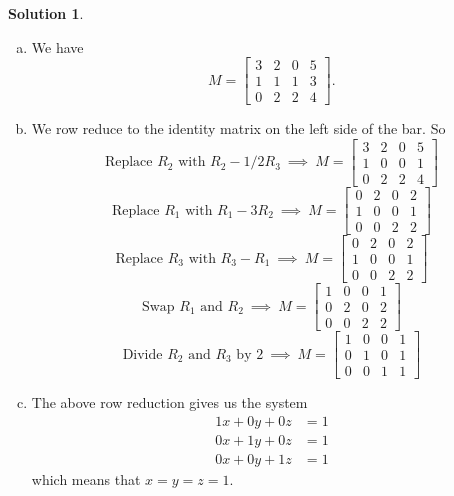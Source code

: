\documentclass[12pt]{report} %
\theoremstyle{definition}
\newtheorem{solution}{Solution}
\begin{document}
\begin{solution}
\begin{enumerate}[(a)]
    \item We have
    \[
    M=\left[ \begin{array}{ccc|c}
        3 & 2 & 0 & 5\\
        1 & 1 & 1 & 3\\
        0 & 2 & 2 & 4
    \end{array}\right].
    \]
    \item We row reduce to the identity matrix on the left side of the bar.  So
    \[
    \textrm{Replace $R_2$ with $R_2-1/2 R_3$} ~\implies~     M=\left[ \begin{array}{ccc|c}
        3 & 2 & 0 & 5\\
        1 & 0 & 0 & 1\\
        0 & 2 & 2 & 4
    \end{array}\right]
    \]
    \[
    \textrm{Replace $R_1$ with $R_1-3 R_2$} ~\implies~     M=\left[ \begin{array}{ccc|c}
        0 & 2 & 0 & 2\\
        1 & 0 & 0 & 1\\
        0 & 0 & 2 & 2
    \end{array}\right]
    \]
    \[
    \textrm{Replace $R_3$ with $R_3- R_1$} ~\implies~     M=\left[ \begin{array}{ccc|c}
        0 & 2 & 0 & 2\\
        1 & 0 & 0 & 1\\
        0 & 0 & 2 & 2
    \end{array}\right]
    \]
    \[
    \textrm{Swap $R_1$ and $R_2$} ~\implies~     M=\left[ \begin{array}{ccc|c}
        1 & 0 & 0 & 1\\
        0 & 2 & 0 & 2\\
        0 & 0 & 2 & 2
    \end{array}\right]
    \]
    \[
    \textrm{Divide $R_2$ and $R_3$ by 2} ~\implies~     M=\left[ \begin{array}{ccc|c}
        1 & 0 & 0 & 1\\
        0 & 1 & 0 & 1\\
        0 & 0 & 1 & 1
    \end{array}\right]
    \]
    
    \item The above row reduction gives us the system
    \begin{align*}
        1x+0y+0z&=1\\
        0x+1y+0z&=1\\
        0x+0y+1z&=1
    \end{align*}
    which means that $x=y=z=1$.
\end{enumerate}
\end{solution}
\end{document}
